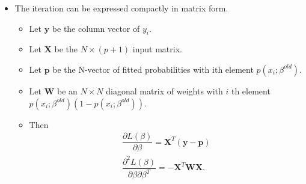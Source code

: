 \documentclass[12pt,notes,mathserif]{beamer}
\begin{document}
\begin{frame}[c]
	\frametitle{}
	\begin{itemize}
		\item  The iteration can be expressed compactly in matrix form.
		      \begin{itemize}
			      \item Let $\bm{y}$ be the column vector of $y_i$.
			      \item Let $\mathbf{X}$ be the $N \times (p + 1)$ input matrix.

			      \item  Let $\mathbf{p}$ be the N-vector of fitted probabilities with ith element $p(x_i;\beta^{old})$.

			      \item  Let $\mathbf{W}$ be an $N \times N$ diagonal matrix of weights with $i$ th element $p(x_i ;\beta^{old})(1 − p(x_i;\beta^{old}))$.

			      \item Then
			            \begin{gather*}
				            \dfrac{\partial L(\beta )}{\partial\beta}=\mathbf{X}^T(\bm{y}-\bm{p})\\
				            \dfrac{\partial^2 L(\beta )}{\partial\beta\partial\beta^T}=-\mathbf{X}^T\mathbf{W}\mathbf{X}.
			            \end{gather*}
		      \end{itemize}
	\end{itemize}
\end{frame}
\end{document}
